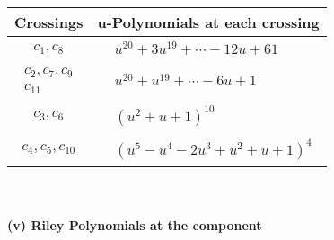\documentclass[1p]{elsarticle_modified}
\theoremstyle{definition}
\begin{document}
\begin{tabular}{m{50pt}|m{274pt}}
Crossings & \hspace{64pt}u-Polynomials at each crossing \\
\hline $$\begin{aligned}c_{1},c_{8}\end{aligned}$$&$\begin{aligned}
&u^{20}+3 u^{19}+\cdots-12 u+61
\end{aligned}$\\
\hline $$\begin{aligned}c_{2},c_{7},c_{9}\\c_{11}\end{aligned}$$&$\begin{aligned}
&u^{20}+u^{19}+\cdots-6 u+1
\end{aligned}$\\
\hline $$\begin{aligned}c_{3},c_{6}\end{aligned}$$&$\begin{aligned}
&(u^2+u+1)^{10}
\end{aligned}$\\
\hline $$\begin{aligned}c_{4},c_{5},c_{10}\end{aligned}$$&$\begin{aligned}
&(u^5- u^4-2 u^3+u^2+u+1)^4
\end{aligned}$\\
\hline
\end{tabular}\\~\\
\newpage\renewcommand{\arraystretch}{1}
\flushleft \textbf{(v) Riley Polynomials at the component}\newline \\
\end{document}
